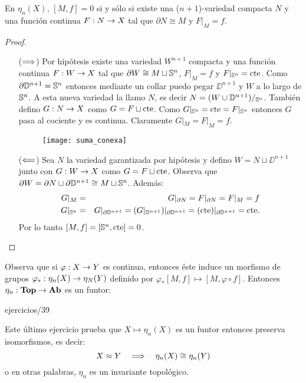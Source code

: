 \documentclass[../../topologia_algebraica]{subfiles}
\begin{document}
\begin{prop}
  En $\eta_n(X)$, $[M,f]=0$ si y s\'olo si existe una ($n+1$)-variedad compacta $N$ y una funci\'on
  continua $F:N\rightarrow X$ tal que $\partial N\cong M$ y $F|_M=f$.
\end{prop}
\begin{proof}$\;$\\
  \begin{enumerate}
  \item[($\Longrightarrow$)] Por hip\'otesis existe una variedad $W^{n+1}$ compacta y una funci\'on continua
    $F:W\rightarrow X$ tal que $\partial W\cong M\sqcup\mathbb{S}^n$, $F|_M=f$ y $F|_{\mathbb{S}^n}=\text{cte}$. Como
    $\partial\mathbb{D}^{n+1}=\mathbb{S}^n$ entonces mediante un collar puedo pegar $\DD^{n+1}$ y $W$ a lo largo
    de $\mathbb{S}^n$. A esta nueva variedad la llamo $N$, es decir $N=(W\cup\mathbb{D}^{n+1})/_{\mathbb{S}^n}$. Tambi\'en
    defino $G:N\rightarrow X$ como $G=F\sqcup\text{cte}$. Como $G|_{\mathbb{S}^n}=\text{cte}=F|_{\mathbb{S}^n}$ entonces $G$ pasa al
    cociente y es continua. Claramente $G|_M=F|_M=f$.
    \begin{figure}[ht]%
      \centering
      \texttt{[image: suma\_conexa]}
    \end{figure}%
  \item[($\Longleftarrow$)] Sea $N$ la variedad garantizada por hip\'otesis y defino $W=N\sqcup\DD^{n+1}$
    junto con $G:W\rightarrow X$ como $G=F\sqcup \text{cte}$. Observa que
    $\partial W=\partial N\sqcup \partial\mathbb{D}^{n+1}\cong M\sqcup\mathbb{S}^n$. Adem\'as:
    \begin{eqnarray*}
      G|_M&=&G|_{\partial N}=F|_{\partial N}=F|_M=f \\
      G|_{\mathbb{S}^n}&=& G|_{\partial\mathbb{D}^{n+1}}=(G|_{\mathbb{D}^{n+1}})|_{\partial\mathbb{D}^{n+1}}=(\text{cte})|_{\partial\mathbb{D}^{n+1}}=\text{cte}.
    \end{eqnarray*}
    Por lo tanto $[M,f]=[\mathbb{S}^n,\text{cte}]=0$.
  \end{enumerate}
\end{proof}


Observa que si $\varphi:X\rightarrow Y$ es continua, entonces \'este induce un morfismo de grupos
$\varphi_*:\eta_n(X)\rightarrow\eta_N(Y)$ definido por $\varphi_*[M,f]\mapsto[M,\varphi\circ f]$. Entonces
$\eta_n:\mathbf{Top}\rightarrow\mathbf{Ab}$ es un funtor:

{ejercicios/39} %

\begin{nota}
  Este \'ultimo ejercicio prueba que $X\mapsto\eta_n(X)$ es un funtor entonces preserva isomorfismos,
  es decir:
  \[
    X\approx Y \quad\Longrightarrow\quad \eta_n(X)\cong\eta_n(Y)
  \]
  o en otras palabras, $\eta_n$ es un invariante topol\'ogico.
\end{nota}
\end{document}
